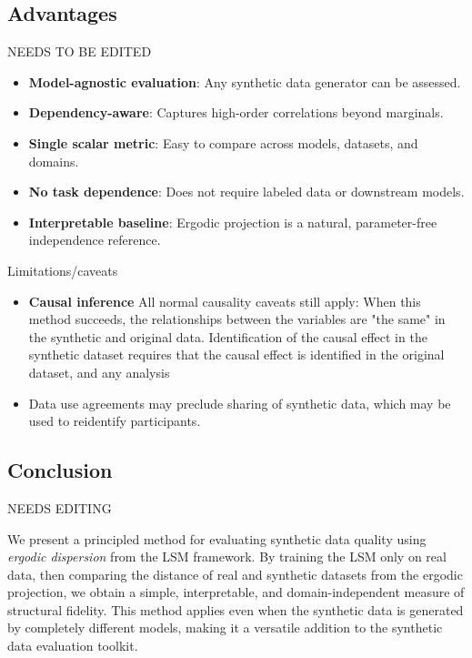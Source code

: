 \documentclass[10pt,journal]{IEEEtran}
\begin{document}
\subsection*{Advantages}
NEEDS TO BE EDITED
{\color{red}
\begin{itemize}
    \item \textbf{Model-agnostic evaluation}: Any synthetic data generator can be assessed.
    \item \textbf{Dependency-aware}: Captures high-order correlations beyond marginals.
    \item \textbf{Single scalar metric}: Easy to compare across models, datasets, and domains.
    \item \textbf{No task dependence}: Does not require labeled data or downstream models.
    \item \textbf{Interpretable baseline}: Ergodic projection is a natural, parameter-free independence reference.
\end{itemize}

Limitations/caveats
\begin{itemize}
    \item \textbf{Causal inference} All normal causality caveats still apply: When this method succeeds, the relationships between the variables are "the same" in the synthetic and original data. Identification of the causal effect in the synthetic dataset requires that the causal effect is identified in the original dataset, and any analysis 
    \item {} Data use agreements may preclude sharing of synthetic data, which may be used to reidentify participants. 
\end{itemize}
}

\subsection*{Conclusion}
NEEDS EDITING

{\color{red} We present a principled method for evaluating synthetic data quality using \emph{ergodic dispersion} from the LSM framework. By training the LSM only on real data, then comparing the distance of real and synthetic datasets from the ergodic projection, we obtain a simple, interpretable, and domain-independent measure of structural fidelity. This method applies even when the synthetic data is generated by completely different models, making it a versatile addition to the synthetic data evaluation toolkit.}




\end{document}
